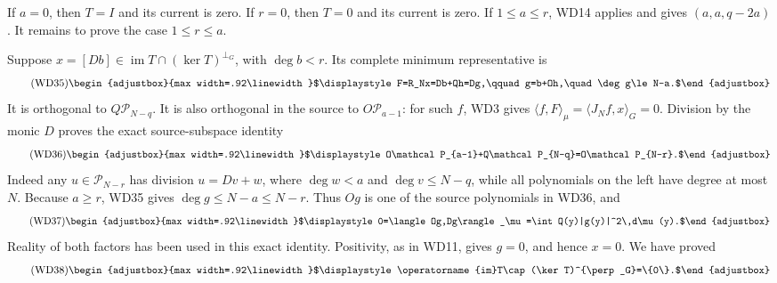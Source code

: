 \documentclass[11pt]{article}
\begin{document}
If \(a=0\), then \(T=I\) and its current is zero. If \(r=0\), then \(T=0\) and its current is zero. If \(1\le a\le r\), WD14 applies and gives \((a,a,q-2a)\). It remains to prove the case \(1\le r\le a\).

Suppose \(x=[Db]\in\operatorname{im}T\cap(\ker T)^{\perp_G}\), with \(\deg b<r\). Its complete minimum representative is 
\begin{equation*}
\tag{WD35}
\begin{adjustbox}{max width=.92\linewidth}$\displaystyle F=R_Nx=Db+Qh=Dg,\qquad g=b+Oh,\quad \deg g\le N-a.$\end{adjustbox}
\end{equation*}
 It is orthogonal to \(Q\mathcal P_{N-q}\). It is also orthogonal in the source to \(O\mathcal P_{a-1}\): for such \(f\), WD3 gives \(\langle f,F\rangle_\mu=\langle J_Nf,x\rangle_G=0\). Division by the monic \(D\) proves the exact source-subspace identity 
\begin{equation*}
\tag{WD36}
\begin{adjustbox}{max width=.92\linewidth}$\displaystyle O\mathcal P_{a-1}+Q\mathcal P_{N-q}=O\mathcal P_{N-r}.$\end{adjustbox}
\end{equation*}
 Indeed any \(u\in\mathcal P_{N-r}\) has division \(u=Dv+w\), where \(\deg w<a\) and \(\deg v\le N-q\), while all polynomials on the left have degree at most \(N\). Because \(a\ge r\), WD35 gives \(\deg g\le N-a\le N-r\). Thus \(Og\) is one of the source polynomials in WD36, and 
\begin{equation*}
\tag{WD37}
\begin{adjustbox}{max width=.92\linewidth}$\displaystyle 0=\langle Og,Dg\rangle_\mu=\int Q(y)|g(y)|^2\,d\mu(y).$\end{adjustbox}
\end{equation*}
 Reality of both factors has been used in this exact identity. Positivity, as in WD11, gives \(g=0\), and hence \(x=0\). We have proved 
\begin{equation*}
\tag{WD38}
\begin{adjustbox}{max width=.92\linewidth}$\displaystyle \operatorname{im}T\cap(\ker T)^{\perp_G}=\{0\}.$\end{adjustbox}
\end{equation*}
\end{document}

